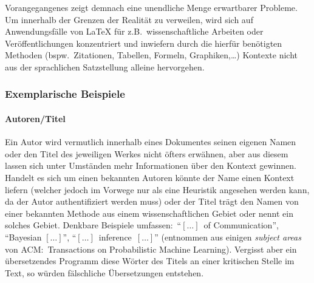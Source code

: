 Vorangegangenes zeigt demnach eine unendliche Menge erwartbarer Probleme. Um innerhalb der Grenzen der Realität zu verweilen, wird sich auf Anwendungsfälle von \LaTeX{} für z.B.\ wissenschaftliche Arbeiten oder Veröffentlichungen konzentriert und inwiefern durch die hierfür benötigten Methoden (bspw.\ Zitationen, Tabellen, Formeln, Graphiken,\ldots)%
Kontexte nicht aus der sprachlichen Satzstellung alleine hervorgehen.\\%



\subsubsection{Exemplarische Beispiele}
\paragraph*{Autoren/Titel}%
%
%
%
Ein Autor wird vermutlich innerhalb eines Dokumentes seinen eigenen Namen oder den Titel des jeweiligen Werkes nicht öfters erwähnen, aber aus diesem lassen sich unter Umständen mehr Informationen über den Kontext gewinnen. Handelt es sich um einen bekannten Autoren könnte der Name einen Kontext liefern (welcher jedoch im Vorwege nur als eine Heuristik angesehen werden kann, da der Autor authentifiziert werden muss) oder der Titel trägt den Namen von einer bekannten Methode aus einem wissenschaftlichen Gebiet oder nennt ein solches Gebiet. Denkbare Beispiele umfassen:\ 
\enquote{$[\ldots]$\ of Communication}, \enquote{Bayesian $[\ldots]$}, \enquote{$[\ldots]$\ inference\ $[\ldots]$}
(entnommen aus einigen \textit{subject areas} von ACM:\ Transactions on Probabilistic Machine Learning).
Vergisst aber ein übersetzendes Programm diese Wörter des Titels an einer kritischen Stelle im Text, so würden fälschliche Übersetzungen entstehen.

